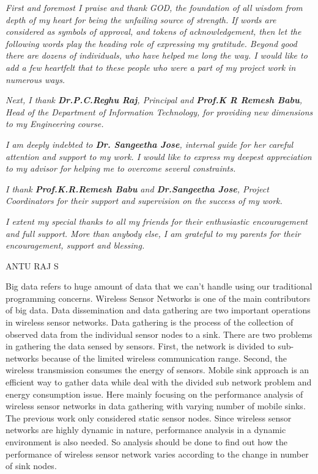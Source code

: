 \documentclass[MTech]{iitmdiss}
\begin{document}
\acknowledgements
\textit{First and foremost I praise and thank GOD, the foundation of all wisdom from depth of my heart for being the unfailing source of strength. If words are considered as symbols of approval, and tokens of acknowledgement, then let the following words play the heading role of expressing my gratitude. Beyond good there are dozens of individuals, who have helped me long the way. I would like to add a few heartfelt that to these people who were a part of my project work in numerous ways.}

\textit{Next, I thank \textbf{Dr.P.C.Reghu Raj}, Principal and \textbf{Prof.K R Remesh Babu}, Head of the Department of Information Technology, for providing new dimensions to my Engineering course.}

\textit{I am deeply indebted to \textbf{Dr. Sangeetha Jose}, internal guide for her careful attention and support to my work. I would like to express my deepest appreciation to my advisor for helping me to overcome several constraints. }

\textit{I thank \textbf{Prof.K.R.Remesh Babu} and \textbf{Dr.Sangeetha Jose}, Project Coordinators for their support and supervision on the success of my work.}

\textit{I extent my special thanks to all my friends for their enthusiastic encouragement and full support. More than anybody else, I am grateful to my parents for their encouragement, support and blessing.}
\vspace*{24pt}

\begin{flushright}ANTU RAJ S\end{flushright}
                              



\abstract
\vspace*{24pt}

\noindent 
Big data refers to huge amount of data that we can't handle using our traditional programming concerns. Wireless Sensor Networks is one of the main contributors of big data. Data dissemination and data gathering are two important operations in wireless sensor networks. Data gathering is the process of the collection of observed data from the individual sensor nodes to a sink. There are two problems in gathering the data sensed by sensors. First, the network is divided to sub-networks because of the limited wireless communication range. Second, the wireless transmission consumes the energy of sensors. Mobile sink approach is an efficient way to gather data while deal with the divided sub network problem and energy consumption issue.
Here mainly focusing on the performance analysis of wireless sensor networks in data gathering with varying number of mobile sinks. The previous work only considered static sensor nodes. Since wireless sensor networks are highly dynamic in nature, performance analysis in a dynamic environment is also needed. So analysis should be done to find out how the performance of wireless sensor network varies according to the change in number of sink nodes.
\end{document}
